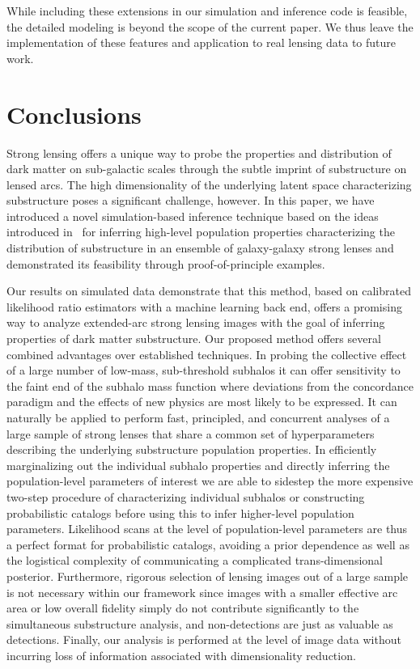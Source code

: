 \documentclass[twocolumn]{aastex63}
\begin{document}
While including these extensions in our simulation and inference code is feasible, the detailed modeling is beyond the scope of the current paper. We thus leave the implementation of these features and application to real lensing data to future work.


\section{Conclusions}
\label{sec:conclusions}

Strong lensing offers a unique way to probe the properties and distribution of dark matter on sub-galactic scales through the subtle imprint of substructure on lensed arcs. The high dimensionality of the underlying latent space characterizing substructure poses a significant challenge, however. In this paper, we have introduced a novel simulation-based inference technique based on the ideas introduced in~\citet{Cranmer:2015bka, 1805.00013, 1805.00020, 1805.12244, Stoye:2018ovl} for inferring high-level population properties characterizing the distribution of substructure in an ensemble of galaxy-galaxy strong lenses and demonstrated its feasibility through proof-of-principle examples.

Our results on simulated data demonstrate that this method, based on calibrated likelihood ratio estimators with a machine learning back end, offers a promising way to analyze extended-arc strong lensing images with the goal of inferring properties of dark matter substructure. Our proposed method offers several combined advantages over established techniques. In probing the collective effect of a large number of low-mass, sub-threshold subhalos it can offer sensitivity to the faint end of the subhalo mass function where deviations from the concordance \lcdm paradigm and the effects of new physics are most likely to be expressed. It can naturally be applied to perform fast, principled, and concurrent analyses of a large sample of strong lenses that share a common set of hyperparameters describing the underlying substructure population properties. In efficiently marginalizing out the individual subhalo properties and directly inferring the population-level parameters of interest we are able to sidestep the more expensive two-step procedure of characterizing individual subhalos or constructing probabilistic catalogs before using this to infer higher-level population parameters. Likelihood scans at the level of population-level parameters are thus a perfect format for probabilistic catalogs, avoiding a prior dependence as well as the logistical complexity of communicating a complicated trans-dimensional posterior. Furthermore, rigorous selection of lensing images out of a large sample is not necessary within our framework since images with a smaller effective arc area or low overall fidelity simply do not contribute significantly to the simultaneous substructure analysis, and non-detections are just as valuable as detections. Finally, our analysis is performed at the level of image data without incurring loss of information associated with dimensionality reduction.
\end{document}
